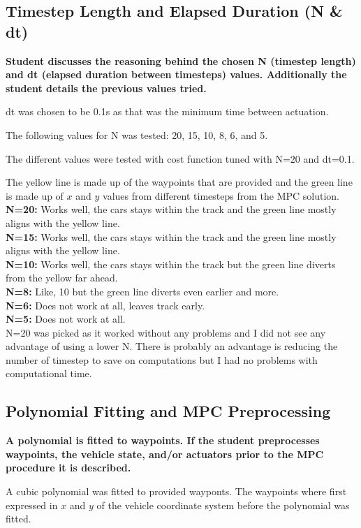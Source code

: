 \documentclass[12pt,a4paper]{article}
\begin{document}
\subsection{Timestep Length and Elapsed Duration (N \& dt)}
\textbf{Student discusses the reasoning behind the chosen N (timestep length) and dt (elapsed duration between timesteps) values. Additionally the student details the previous values tried.}

dt was chosen to be 0.1s as that was the minimum time between actuation. 

The following values for N was tested: 20, 15, 10, 8, 6, and 5.

The different values were tested with cost function tuned with N=20 and dt=0.1.

The yellow line is made up of the waypoints that are provided and the green line is made up of $x$ and $y$ values from different timesteps from the MPC solution. \\

{\bf N=20:} Works well, the cars stays within the track and the green line mostly aligns with the yellow line. \\
{\bf N=15:} Works well, the cars stays within the track and the green line mostly aligns with the yellow line.  \\
{\bf N=10:} Works well, the cars stays within the track but the green line diverts from the yellow far ahead. \\
{\bf N=8:} Like, 10 but the green line diverts even earlier and more. \\
{\bf N=6:} Does not work at all, leaves track early.\\
{\bf N=5:} Does not work at all. \\ 

N=20 was picked as it worked without any problems and I did not see any advantage of using a lower N. There is probably an advantage is reducing the number of timestep to save on computations but I had no problems with computational time.


\subsection{Polynomial Fitting and MPC Preprocessing}
\textbf{A polynomial is fitted to waypoints. If the student preprocesses waypoints, the vehicle state, and/or actuators prior to the MPC procedure it is described.}

A cubic polynomial was fitted to provided wayponts. The waypoints where first expressed in $x$ and $y$ of the vehicle coordinate system before the polynomial was fitted. 
\end{document}
